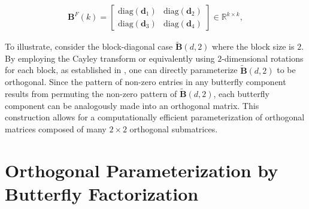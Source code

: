 \begin{equation}\label{eq:but_factor}
\begin{aligned}
    \bm{B}^F(k)=\begin{bmatrix}
    \text{diag}(\bm{d}_1) & \text{diag}(\bm{d}_2) \\
    \text{diag}(\bm{d}_3) & \text{diag}(\bm{d}_4)
    \end{bmatrix}\in\mathbb{R}^{k\times k},
\end{aligned}
\end{equation}

To illustrate, consider the block-diagonal case $\tilde{\bm{B}}(d,2)$ where the block size is $2$. By employing the Cayley transform or equivalently using $2$-dimensional rotations for each block, as established in \cite{liu2021orthogonal,qiu2023controlling}, one can directly parameterize $\tilde{\bm{B}}(d,2)$ to be orthogonal. Since the pattern of non-zero entries in any butterfly component results from permuting the non-zero pattern of $\tilde{\bm{B}}(d,2)$, each butterfly component can be analogously made into an orthogonal matrix. This construction allows for a computationally efficient parameterization of orthogonal matrices composed of many $2\times 2$ orthogonal submatrices.

\section{Orthogonal Parameterization by Butterfly Factorization}


